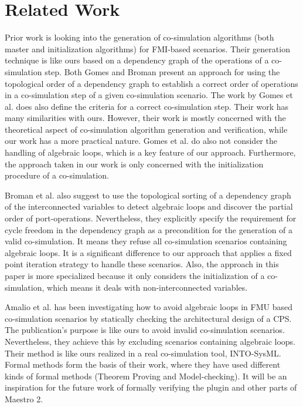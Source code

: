\section{Related Work}
Prior work \cite{Gomes2019, BromanCompositionCo-Simulation} is looking into the generation of co-simulation algorithms (both master and initialization algorithms) for FMI-based scenarios. Their generation technique is like ours based on a dependency graph of the operations of a co-simulation step. Both Gomes and Broman present an approach for using the topological order of a dependency graph to establish a correct order of operations in a co-simulation step of a given co-simulation scenario.
The work by Gomes et al. \cite{Gomes2019} does also define the criteria for a correct co-simulation step. Their work has many similarities with ours. However, their work is mostly concerned with the theoretical aspect of co-simulation algorithm generation and verification, while our work has a more practical nature. Gomes et al. do also not consider the handling of algebraic loops, which is a key feature of our approach. Furthermore, the approach taken in our work is only concerned with the initialization procedure of a co-simulation.

Broman et al. \cite{BromanCompositionCo-Simulation} also suggest to use the topological sorting of a dependency graph of the interconnected variables to detect algebraic loops and discover the partial order of port-operations. Nevertheless, they explicitly specify the requirement for cycle freedom in the dependency graph as a precondition for the generation of a valid co-simulation. It means they refuse all co-simulation scenarios containing algebraic loops. It is a significant difference to our approach that applies a fixed point iteration strategy to handle these scenarios. Also, the approach in this paper is more specialized because it only considers the initialization of a co-simulation, which means it deals with non-interconnected variables.

Amalio et al. \cite{Amalio2016CheckingCo-simulation} has been investigating 
how to avoid algebraic loops in FMU based co-simulation scenarios by statically checking the architectural design of a CPS. The publication's purpose is like ours to avoid invalid co-simulation scenarios. Nevertheless, they achieve this by excluding scenarios containing algebraic loops. Their method is like ours realized in a real co-simulation tool, INTO-SysML\cite{Miyazawa2016INtegratedModelling}. Formal methods form the basis of their work, where they have used different kinds of formal methods (Theorem Proving and Model-checking). It will be an inspiration for the future work of formally verifying the plugin and other parts of Maestro 2. 

